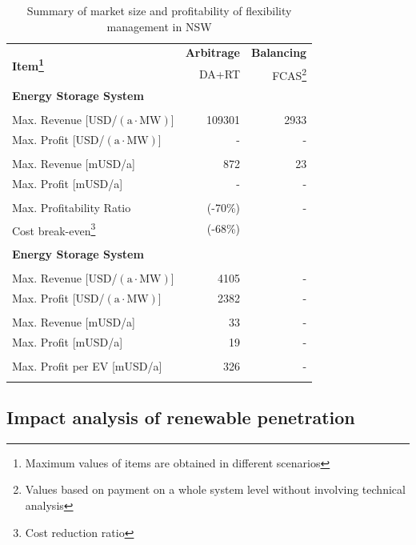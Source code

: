 \begin{table}
	\centering
	\begin{tabular}{l r r}
		\hline
		\multirow{2}{*}{\textbf{Item\footnote{Maximum values of items are obtained in different scenarios}}}& \textbf{Arbitrage} & \textbf{Balancing} \\
		\multirow{2}{*}{}& DA+RT & FCAS\footnote{Values based on payment on a whole system level without involving technical analysis} \\
		\hline
		\multicolumn{3}{l}{\textbf{Energy Storage System}} \\
		& & \\
		Max. Revenue [USD/$(\text{a} \cdot \text{MW})$] & \num{109301} & \num{2933} \\
		Max. Profit [USD/$(\text{a} \cdot \text{MW})$] & - & - \\
		& & \\
		Max. Revenue [mUSD/a] & \num{872} & \num{23} \\
		Max. Profit [mUSD/a] & - & - \\
		& & \\
		Max. Profitability Ratio & (-70\%) & - \\
		Cost break-even\footnote{Cost reduction ratio} & (-68\%) & \\
		& & \\
		\hline
		\multicolumn{3}{l}{\textbf{Energy Storage System}} \\
		& & \\
		Max. Revenue [USD/$(\text{a} \cdot \text{MW})$] & \num{4105} & - \\
		Max. Profit [USD/$(\text{a} \cdot \text{MW})$] & \num{2382} & - \\
		& & \\
		Max. Revenue [mUSD/a] & \num{33} & - \\
		Max. Profit [mUSD/a] & 19 & - \\
		& & \\
		Max. Profit per EV [mUSD/a]& 326 & - \\
		& & \\
		\hline
	\end{tabular}
	\caption{Summary of market size and profitability of flexibility management in NSW}\label{tab:nsw-summary}
\end{table}

\newpage
\subsection{Impact analysis of renewable penetration}
\label{sec:impact-market-condition}

